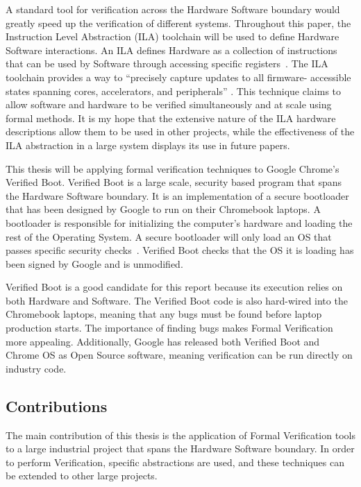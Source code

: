 A standard tool for verification across the Hardware Software boundary would
greatly speed up the verification of different systems.
Throughout this paper, the  Instruction Level Abstraction (ILA) toolchain will be used to define Hardware Software interactions.
An ILA defines Hardware as a collection of instructions that can be used by
Software through accessing specific registers~\cite{ila}.
The ILA toolchain provides a way to ``precisely capture updates to all firmware-
accessible states spanning cores, accelerators, and peripherals''
\cite{ila-template}.
This technique claims to allow software and hardware to be verified simultaneously and at scale using formal methods.
It is my hope that the extensive nature of the ILA hardware descriptions allow
them to be used in other projects, while the effectiveness of the ILA abstraction
in a large system displays its use in future papers. 

This thesis will be applying formal verification techniques to Google Chrome's
Verified Boot.
Verified Boot is a large scale, security based program that spans the Hardware
Software boundary. 
It is an implementation of a secure bootloader that has been designed by Google to run on their Chromebook laptops.
A bootloader is responsible for initializing the computer's hardware and
loading the rest of the Operating System.
A secure bootloader will only load an OS that passes specific
security checks~\cite{secure-bootloader}.
Verified Boot checks that the OS it is loading has been signed by Google and is
unmodified.

Verified Boot is a good candidate for this report because its execution relies
on both Hardware and Software.
The Verified Boot code is also hard-wired into the Chromebook laptops, meaning
that any bugs must be found before laptop production starts.
The importance of finding bugs makes Formal Verification more appealing.
Additionally, Google has released both Verified Boot and Chrome OS as Open
Source software, meaning verification can be run directly on industry code.

\subsection{Contributions}

The main contribution of this thesis is the application of Formal Verification
tools to a large industrial project that spans the Hardware Software boundary.
In order to perform Verification, specific abstractions are used, and these
techniques can be extended to other large projects.

